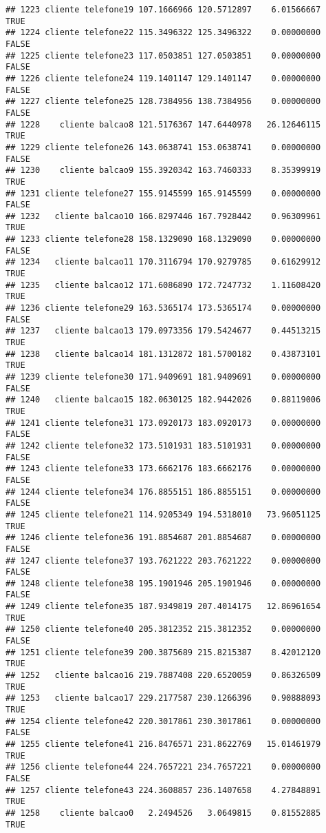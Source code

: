 \documentclass[
]{article}
\begin{document}
\begin{verbatim}
## 1223 cliente telefone19 107.1666966 120.5712897    6.01566667     TRUE
## 1224 cliente telefone22 115.3496322 125.3496322    0.00000000    FALSE
## 1225 cliente telefone23 117.0503851 127.0503851    0.00000000    FALSE
## 1226 cliente telefone24 119.1401147 129.1401147    0.00000000    FALSE
## 1227 cliente telefone25 128.7384956 138.7384956    0.00000000    FALSE
## 1228    cliente balcao8 121.5176367 147.6440978   26.12646115     TRUE
## 1229 cliente telefone26 143.0638741 153.0638741    0.00000000    FALSE
## 1230    cliente balcao9 155.3920342 163.7460333    8.35399919     TRUE
## 1231 cliente telefone27 155.9145599 165.9145599    0.00000000    FALSE
## 1232   cliente balcao10 166.8297446 167.7928442    0.96309961     TRUE
## 1233 cliente telefone28 158.1329090 168.1329090    0.00000000    FALSE
## 1234   cliente balcao11 170.3116794 170.9279785    0.61629912     TRUE
## 1235   cliente balcao12 171.6086890 172.7247732    1.11608420     TRUE
## 1236 cliente telefone29 163.5365174 173.5365174    0.00000000    FALSE
## 1237   cliente balcao13 179.0973356 179.5424677    0.44513215     TRUE
## 1238   cliente balcao14 181.1312872 181.5700182    0.43873101     TRUE
## 1239 cliente telefone30 171.9409691 181.9409691    0.00000000    FALSE
## 1240   cliente balcao15 182.0630125 182.9442026    0.88119006     TRUE
## 1241 cliente telefone31 173.0920173 183.0920173    0.00000000    FALSE
## 1242 cliente telefone32 173.5101931 183.5101931    0.00000000    FALSE
## 1243 cliente telefone33 173.6662176 183.6662176    0.00000000    FALSE
## 1244 cliente telefone34 176.8855151 186.8855151    0.00000000    FALSE
## 1245 cliente telefone21 114.9205349 194.5318010   73.96051125     TRUE
## 1246 cliente telefone36 191.8854687 201.8854687    0.00000000    FALSE
## 1247 cliente telefone37 193.7621222 203.7621222    0.00000000    FALSE
## 1248 cliente telefone38 195.1901946 205.1901946    0.00000000    FALSE
## 1249 cliente telefone35 187.9349819 207.4014175   12.86961654     TRUE
## 1250 cliente telefone40 205.3812352 215.3812352    0.00000000    FALSE
## 1251 cliente telefone39 200.3875689 215.8215387    8.42012120     TRUE
## 1252   cliente balcao16 219.7887408 220.6520059    0.86326509     TRUE
## 1253   cliente balcao17 229.2177587 230.1266396    0.90888093     TRUE
## 1254 cliente telefone42 220.3017861 230.3017861    0.00000000    FALSE
## 1255 cliente telefone41 216.8476571 231.8622769   15.01461979     TRUE
## 1256 cliente telefone44 224.7657221 234.7657221    0.00000000    FALSE
## 1257 cliente telefone43 224.3608857 236.1407658    4.27848891     TRUE
## 1258    cliente balcao0   2.2494526   3.0649815    0.81552885     TRUE

\end{verbatim}
\end{document}
